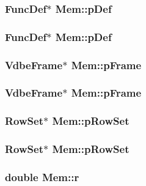 \subsubsection{\setlength{\rightskip}{0pt plus 5cm}\bf{Func\-Def}$\ast$ \bf{Mem::p\-Def}}\label{structMem_b175ada2dae53614481abcbd8e9e8943}


\subsubsection{\setlength{\rightskip}{0pt plus 5cm}\bf{Func\-Def}$\ast$ \bf{Mem::p\-Def}}\label{structMem_b175ada2dae53614481abcbd8e9e8943}


\subsubsection{\setlength{\rightskip}{0pt plus 5cm}\bf{Vdbe\-Frame}$\ast$ \bf{Mem::p\-Frame}}\label{structMem_91654c5d64fd10e29d0d99cb5e8f1946}


\subsubsection{\setlength{\rightskip}{0pt plus 5cm}\bf{Vdbe\-Frame}$\ast$ \bf{Mem::p\-Frame}}\label{structMem_91654c5d64fd10e29d0d99cb5e8f1946}


\subsubsection{\setlength{\rightskip}{0pt plus 5cm}\bf{Row\-Set}$\ast$ \bf{Mem::p\-Row\-Set}}\label{structMem_411b269b8f9167eff8b773a80849ff2f}


\subsubsection{\setlength{\rightskip}{0pt plus 5cm}\bf{Row\-Set}$\ast$ \bf{Mem::p\-Row\-Set}}\label{structMem_411b269b8f9167eff8b773a80849ff2f}


\subsubsection{\setlength{\rightskip}{0pt plus 5cm}double \bf{Mem::r}}\label{structMem_8152dc47379b40fbf4a0c0246268889c}


